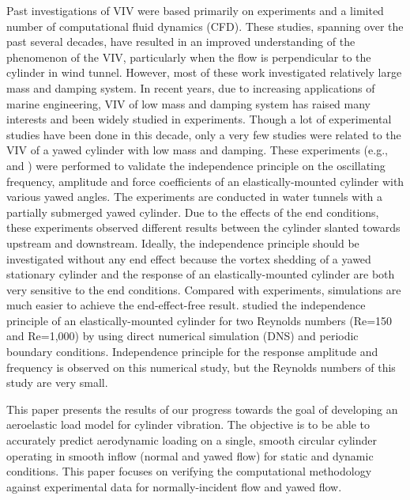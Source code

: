 Past investigations of VIV were based primarily on experiments and a limited
number of computational fluid dynamics (CFD). These studies, spanning over the
past several decades, have resulted in an improved understanding of the
phenomenon of the VIV, particularly when the flow is perpendicular to the
cylinder in wind tunnel.  However, most of these work investigated relatively
large mass and damping system.  In recent years, due to increasing applications
of marine engineering, VIV of low mass and damping system has raised many
interests and been widely studied in experiments. Though a lot of experimental
studies have been done in this decade, only a very few studies were related to
the VIV of a yawed cylinder with low mass and damping. These experiments
(e.g.,~\citet{jain2013vortex} and \citet{franzini2013one}) were performed to
validate the independence principle on the oscillating frequency, amplitude and
force coefficients of an elastically-mounted cylinder with various yawed
angles. The experiments are conducted in water tunnels with a partially
submerged yawed cylinder. Due to the effects of the end conditions, these
experiments observed different results between the cylinder slanted towards
upstream and downstream.  Ideally, the independence principle should be
investigated without any end effect because the vortex shedding of a yawed
stationary cylinder and the response of an elastically-mounted cylinder are
both very sensitive to the end conditions. Compared with experiments,
simulations are much easier to achieve the end-effect-free result.
\citet{zhao2015validity} studied the independence principle of an
elastically-mounted cylinder for two Reynolds numbers (Re=150 and Re=1,000) by
using direct numerical simulation (DNS) and periodic boundary conditions.
Independence principle for the response amplitude and frequency is observed on
this numerical study, but the Reynolds numbers of this study are very small.
	
This paper presents the results of our progress towards the goal of developing
an aeroelastic load model for cylinder vibration. The objective is to be able
to accurately predict aerodynamic loading on a single, smooth circular cylinder
operating in smooth inflow (normal and yawed flow) for static and dynamic
conditions. This paper focuses on verifying the computational methodology
against experimental data for normally-incident flow and yawed flow.

